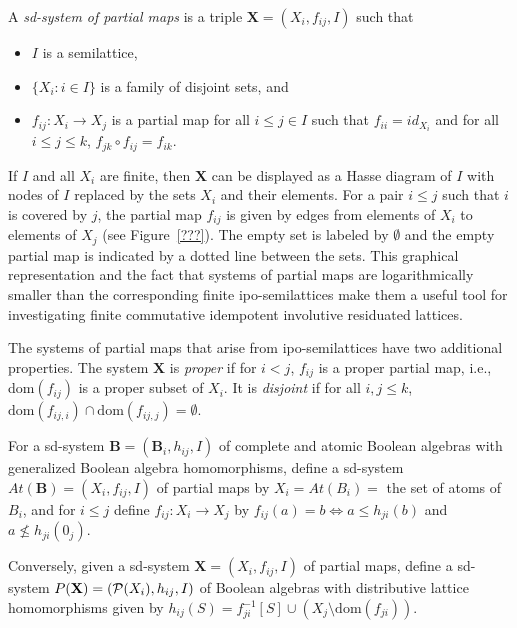 \documentclass[12pt]{amsart}
\newcommand{\m}{\mathbf} %
\begin{document}
A \emph{sd-system of partial maps} is a triple $\m X=(X_i,f_{ij},I)$ such that
\begin{itemize}
\item $I$ is a semilattice,
\item $\{X_i:i\in I\}$ is a family of disjoint sets, and
\item $f_{ij}: X_i\to X_j$ is a partial map for all $i\le j\in I$ such that $f_{ii}=id_{X_i}$ and for all $i\le j\le k$, $f_{jk}\circ f_{ij}=f_{ik}$.
\end{itemize}

If $I$ and all $X_i$ are finite, then $\m X$ can be displayed as a Hasse diagram of $I$ with
nodes of $I$ replaced by the sets $X_i$ and their elements. For a pair $i\le j$ such that $i$ is covered by $j$, the partial map $f_{ij}$ is given by edges from elements of $X_i$ to elements of $X_j$ (see Figure~\ref{???}). The empty set is labeled by $\emptyset$ and the empty partial map is indicated by a dotted line between the sets. This graphical representation and the fact that
systems of partial maps are logarithmically smaller than the corresponding finite ipo-semilattices
make them a useful tool for investigating finite commutative idempotent involutive residuated lattices.

The systems of partial maps that arise from ipo-semilattices have two additional properties.
The system $\m X$ is \emph{proper} if for $i<j$, $f_{ij}$ is a proper partial map, i.e., dom$(f_{ij})$ is a proper subset of $X_i$. It is \emph{disjoint} if for all $i,j\le k$, $\text{dom}(f_{ij,i})\cap\text{dom}(f_{ij,j})=\emptyset$.

For a sd-system $\m B=(\m B_i,h_{ij},I)$ of complete and atomic Boolean algebras with generalized Boolean algebra homomorphisms, define a sd-system $At(\m B)=(X_i,f_{ij},I)$ of partial maps by $X_i=At(B_i)=$ the set of atoms of $B_i$, and for $i\le j$ define $f_{ij}:X_i\to X_j$ by $f_{ij}(a)=b\iff a\le h_{ji}(b)$ and $a\nleq h_{ji}(0_j)$.

Conversely, given a sd-system $\m X=(X_i,f_{ij},I)$ of partial maps, define a sd-system $\m \mathcal P(\m X)=(\mathcal P(X_i),h_{ij},I)$ of Boolean algebras with distributive lattice homomorphisms given by $h_{ij}(S)=f_{ji}^{-1}[S]\cup(X_j\setminus \text{dom}(f_{ji}))$.
\end{document}
